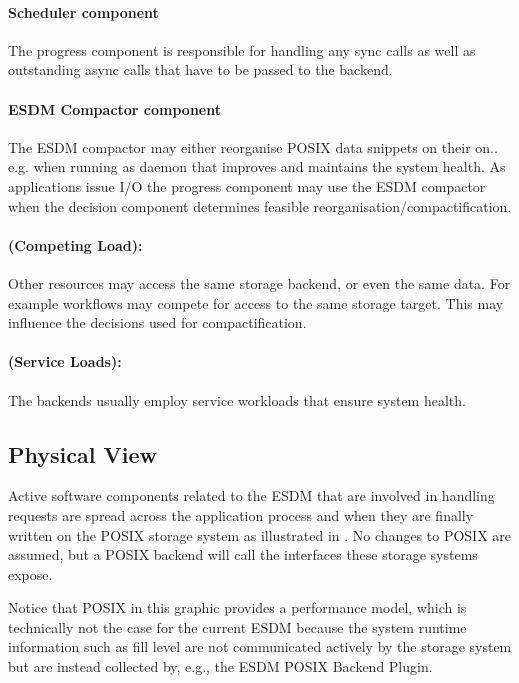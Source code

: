 \paragraph{Scheduler component}
The progress component is responsible for handling any sync calls as well as outstanding async calls that have to be passed to the backend.


\paragraph{ESDM Compactor component}
The ESDM compactor may either reorganise POSIX data snippets on their on.. e.g. when running as daemon that improves and maintains the system health.
As applications issue I/O the progress component may use the ESDM compactor when the decision component determines feasible reorganisation/compactification.


\paragraph{(Competing Load):}
Other resources may access the same storage backend, or even the same data.
For example workflows may compete for access to the same storage target.
This may influence the decisions used for compactification.


\paragraph{(Service Loads):}
The backends usually employ service workloads that ensure system health.




\subsection{Physical View}

Active software components related to the ESDM that are involved in handling requests are spread across the application process and when they are finally written on the POSIX storage system as illustrated in .
No changes to POSIX are assumed, but a POSIX backend will call the interfaces these storage systems expose.

Notice that POSIX in this graphic provides a performance model, which is technically not the case for the current ESDM because the system runtime information such as fill level are not communicated actively by the storage system but are instead collected by, e.g., the ESDM POSIX Backend Plugin.


